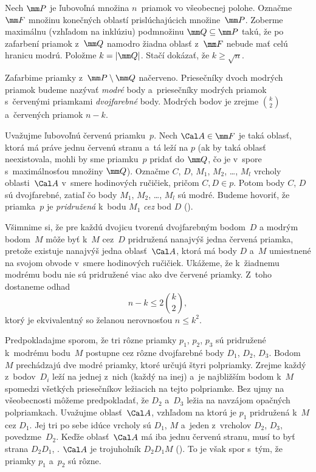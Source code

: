 {%
Nech $\mm P$ je ľubovoľná množina $n$~priamok vo všeobecnej polohe. Označme $\mm F$ množinu konečných oblastí prislúchajúcich množine~$\mm P$. Zoberme maximálnu (vzhľadom na inklúziu) podmnožinu $\mm Q\subseteq \mm P$ takú, že po zafarbení priamok z~$\mm Q$ namodro žiadna oblasť z~$\mm F$ nebude mať celú hranicu modrú. Položme $k=|\mm Q|$. Stačí dokázať, že ${k \ge \sqrt{n}}$.

Zafarbime priamky z~$\mm P \setminus\mm Q$ načerveno. Priesečníky dvoch modrých priamok budeme nazývať {\it modré\/} body a~priesečníky modrých priamok s~červenými priamkami {\it dvojfarebné\/} body. Modrých bodov je zrejme $\binom{k}{2}$ a~červených priamok $n-k$.

Uvažujme ľubovoľnú červenú priamku~$p$. Nech $\Cal A\in\mm F$ je taká oblasť, ktorá má práve jednu červenú stranu a~tá leží na $p$ (ak by taká oblasť neexistovala, mohli by sme priamku~$p$ pridať do $\mm Q$, čo je v~spore s~maximálnosťou množiny $\mm Q$). Označme $C$, $D$, $M_1$, $M_2$, \dots, $M_l$ vrcholy oblasti~$\Cal A$ v~smere hodinových ručičiek, pričom $C, D\in p$. Potom body $C$, $D$ sú dvojfarebné, zatiaľ čo body $M_1$, $M_2$, \dots, $M_l$ sú modré. Budeme hovoriť, že priamka~$p$ je {\it pridružená\/} k~bodu $M_1$ {\it cez\/} bod $D$ (\obr).
%

Všimnime si, že pre každú dvojicu tvorenú dvojfarebným bodom~$D$ a modrým bodom~$M$ môže byť k~$M$ cez~$D$ pridružená nanajvýš jedna červená priamka, pretože existuje nanajvýš jedna oblasť~$\Cal A$, ktorá má body $D$ a~$M$ umiestnené na svojom obvode v~smere hodinových ručičiek. Ukážeme, že k~žiadnemu modrému bodu nie sú pridružené viac ako dve červené priamky. Z~toho dostaneme odhad
$$
n-k \le 2\binom{k}{2},
$$
ktorý je ekvivalentný so želanou nerovnosťou $n\le k^2$.

Predpokladajme sporom, že tri rôzne priamky $p_1$, $p_2$, $p_3$ sú pridružené k~modrému bodu~$M$ postupne cez rôzne dvojfarebné body $D_1$, $D_2$, $D_3$. Bodom~$M$ prechádzajú dve modré priamky, ktoré určujú štyri polpriamky. Zrejme každý z~bodov~$D_i$ leží na jednej z~nich (každý na inej) a~je najbližším bodom k~$M$ spomedzi všetkých priesečníkov ležiacich na tejto polpriamke. Bez ujmy na všeobecnosti môžeme predpokladať, že $D_2$ a~$D_3$ ležia na navzájom opačných polpriamkach.
%
Uvažujme oblasť~$\Cal A$, vzhľadom na ktorú je $p_1$ pridružená k~$M$ cez $D_1$. Jej tri po sebe idúce vrcholy sú $D_1$, $M$ a~jeden z~vrcholov $D_2$, $D_3$, povedzme~$D_2$. Keďže oblasť~$\Cal A$ má iba jednu červenú stranu, musí to byť strana $D_2D_1$, \tj. $\Cal A$ je trojuholník $D_2D_1M$ (\obr). To je však spor s~tým, že priamky $p_1$ a~$p_2$ sú rôzne.
}

